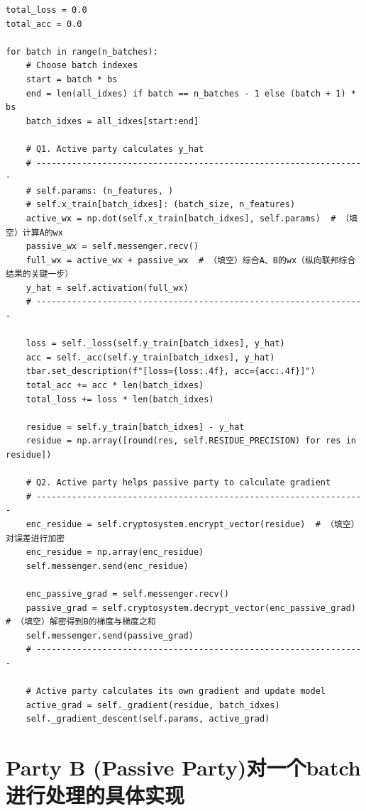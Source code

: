 \documentclass[twoside,11pt]{article}
\begin{document}
\begin{lstlisting}
total_loss = 0.0
total_acc = 0.0

for batch in range(n_batches):
    # Choose batch indexes
    start = batch * bs
    end = len(all_idxes) if batch == n_batches - 1 else (batch + 1) * bs
    batch_idxes = all_idxes[start:end]

    # Q1. Active party calculates y_hat
    # -----------------------------------------------------------------
    # self.params: (n_features, )
    # self.x_train[batch_idxes]: (batch_size, n_features)
    active_wx = np.dot(self.x_train[batch_idxes], self.params)  # （填空）计算A的wx
    passive_wx = self.messenger.recv()
    full_wx = active_wx + passive_wx  # （填空）综合A、B的wx（纵向联邦综合结果的关键一步）
    y_hat = self.activation(full_wx)
    # -----------------------------------------------------------------

    loss = self._loss(self.y_train[batch_idxes], y_hat)
    acc = self._acc(self.y_train[batch_idxes], y_hat)
    tbar.set_description(f"[loss={loss:.4f}, acc={acc:.4f}]")
    total_acc += acc * len(batch_idxes)
    total_loss += loss * len(batch_idxes)

    residue = self.y_train[batch_idxes] - y_hat
    residue = np.array([round(res, self.RESIDUE_PRECISION) for res in residue])

    # Q2. Active party helps passive party to calculate gradient
    # -----------------------------------------------------------------
    enc_residue = self.cryptosystem.encrypt_vector(residue)  # （填空）对误差进行加密
    enc_residue = np.array(enc_residue)
    self.messenger.send(enc_residue)

    enc_passive_grad = self.messenger.recv()
    passive_grad = self.cryptosystem.decrypt_vector(enc_passive_grad)  # （填空）解密得到B的梯度与梯度之和
    self.messenger.send(passive_grad)
    # -----------------------------------------------------------------

    # Active party calculates its own gradient and update model
    active_grad = self._gradient(residue, batch_idxes)
    self._gradient_descent(self.params, active_grad)
\end{lstlisting}

\section{Party B (Passive Party)对一个batch进行处理的具体实现}
\end{document}
